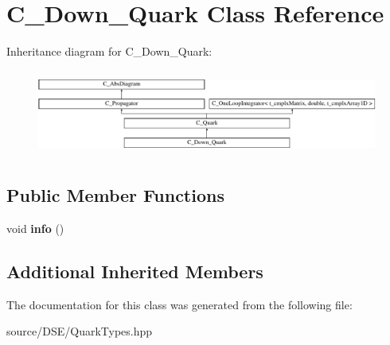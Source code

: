 \hypertarget{class_c___down___quark}{\section{C\-\_\-\-Down\-\_\-\-Quark Class Reference}
\label{class_c___down___quark}
}
Inheritance diagram for C\-\_\-\-Down\-\_\-\-Quark\-:\begin{figure}[H]
\begin{center}
\leavevmode
\includegraphics[height=2.871795cm]{class_c___down___quark}
\end{center}
\end{figure}
\subsection*{Public Member Functions}
\begin{DoxyCompactItemize}
\item 
\hypertarget{class_c___down___quark_a24efadd8c5e082d85b02e376f08bf6cc}{void {\bfseries info} ()}\label{class_c___down___quark_a24efadd8c5e082d85b02e376f08bf6cc}

\end{DoxyCompactItemize}
\subsection*{Additional Inherited Members}


The documentation for this class was generated from the following file\-:\begin{DoxyCompactItemize}
\item 
source/\-D\-S\-E/Quark\-Types.\-hpp\end{DoxyCompactItemize}
